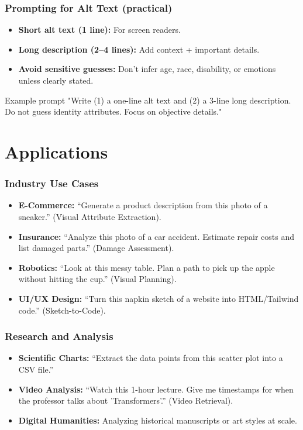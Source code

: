 \documentclass{beamer}
\begin{document}
\begin{frame}
    \frametitle{Prompting for Alt Text (practical)}
    \begin{itemize}
        \item \textbf{Short alt text (1 line):} For screen readers.
        \item \textbf{Long description (2--4 lines):} Add context + important details.
        \item \textbf{Avoid sensitive guesses:} Don't infer age, race, disability, or emotions unless clearly stated.
    \end{itemize}
    \begin{block}{Example prompt}
        "Write (1) a one-line alt text and (2) a 3-line long description.
        Do not guess identity attributes. Focus on objective details."
    \end{block}
\end{frame}

\section{Applications}

\begin{frame}
    \frametitle{Industry Use Cases}
    \begin{itemize}
        \item \textbf{E-Commerce:} ``Generate a product description from this photo of a sneaker.'' (Visual Attribute Extraction).
        \item \textbf{Insurance:} ``Analyze this photo of a car accident. Estimate repair costs and list damaged parts.'' (Damage Assessment).
        \item \textbf{Robotics:} ``Look at this messy table. Plan a path to pick up the apple without hitting the cup.'' (Visual Planning).
        \item \textbf{UI/UX Design:} ``Turn this napkin sketch of a website into HTML/Tailwind code.'' (Sketch-to-Code).
    \end{itemize}
\end{frame}

\begin{frame}
    \frametitle{Research and Analysis}
    \begin{itemize}
        \item \textbf{Scientific Charts:} ``Extract the data points from this scatter plot into a CSV file.''
        \item \textbf{Video Analysis:} ``Watch this 1-hour lecture. Give me timestamps for when the professor talks about 'Transformers'.'' (Video Retrieval).
        \item \textbf{Digital Humanities:} Analyzing historical manuscripts or art styles at scale.
    \end{itemize}
\end{frame}
\end{document}
